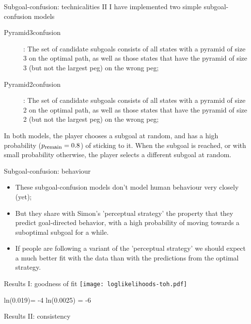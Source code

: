 \documentclass[xcolor=table]{beamer}
\newcommand{\sub}[1]{\mbox{\footnotesize #1}}
\begin{document}
\begin{frame}{Subgoal-confusion: technicalities II}
I have implemented two simple subgoal-confusion models
  \begin{description}
  \item[Pyramid3confusion]: The set of candidate subgoals consists of all states with a pyramid of size 3 on the optimal path, as well as those states that have the pyramid of size 3 (but not the largest peg) on the wrong peg;
\pause
  \item[Pyramid2confusion]: The set of candidate subgoals consists of all states with a pyramid of size 2 on the optimal path, as well as those states that have the pyramid of size 2 (but not the largest peg) on the wrong peg;
  \end{description}

\pause
In both models, the player chooses a subgoal at random, and has a high probability ($p_{\sub{remain}}=0.8$) of sticking to it. When the subgoal is reached, or with small probability otherwise, the player selects a different subgoal at random.
\end{frame}

\begin{frame}{Subgoal-confusion: behaviour}
  \begin{itemize}[<+->]
  \item These subgoal-confusion models don't model human behaviour very closely (yet);
  \item But they share with Simon's 'perceptual strategy' the property that they predict goal-directed behavior, with a high probability of moving towards a suboptimal subgoal for a while.
  \item If people are following a variant of the 'perceptual strategy' we should expect a much better fit with the data than with the predictions from the optimal strategy.
  \end{itemize}
\end{frame}

\begin{frame}{Results I: goodness of fit}
 \texttt{[image: loglikelihoods-toh.pdf]}

ln(0.019)= -4
ln(0.0025) = -6
\end{frame}

\begin{frame}{Results II: consistency}
\end{frame}
\end{document}
